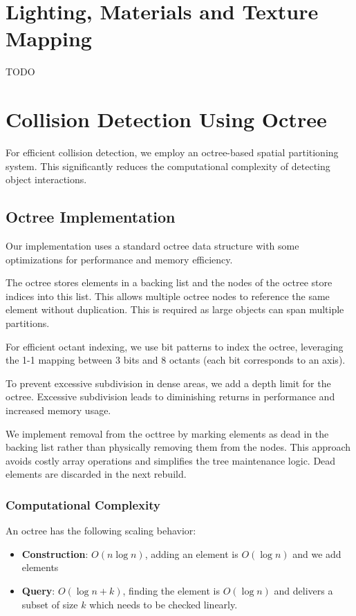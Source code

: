 \documentclass{article}
\begin{document}
\section{Lighting, Materials and Texture Mapping}
TODO

\section{Collision Detection Using Octree}

For efficient collision detection, we employ an octree-based spatial
partitioning system. This significantly reduces the computational complexity of
detecting object interactions.

\subsection{Octree Implementation}

Our implementation uses a standard octree data structure with some
optimizations for performance and memory efficiency.

The octree stores elements in a backing list and the nodes of the octree store
indices into this list. This allows multiple octree nodes to reference the same
element without duplication. This is required as large objects can span
multiple partitions.

For efficient octant indexing, we use bit patterns to index the octree,
leveraging the 1-1 mapping between 3 bits and 8 octants (each bit corresponds
to an axis).

To prevent excessive subdivision in dense areas, we add a depth limit for the
octree. Excessive subdivision leads to diminishing returns in performance and
increased memory usage.

We implement removal from the octtree by marking elements as dead in the
backing list rather than physically removing them from the nodes. This approach
avoids costly array operations and simplifies the tree maintenance logic. Dead
elements are discarded in the next rebuild.

\subsubsection{Computational Complexity}
An octree has the following scaling behavior:
\begin{itemize}
	\item \textbf{Construction}: $O(n \log n)$, adding an element is
		$O(\log n)$ and we add  elements

	\item \textbf{Query}: $O(\log n + k)$, finding the element is $O(\log n)$
		and delivers a subset of size $k$ which needs to be checked linearly.
\end{itemize}
\end{document}

